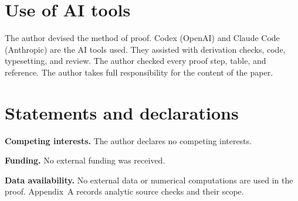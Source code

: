 \documentclass{amsart}
\numberwithin{equation}{section}
\theoremstyle{definition}
\theoremstyle{plain}
\begin{document}




\appendix



\section*{Use of AI tools}
The author devised the method of proof.
Codex (OpenAI) and Claude Code (Anthropic) are the AI tools used.
They assisted with derivation checks, code, typesetting, and review.
The author checked every proof step, table, and reference.
The author takes full responsibility for the content of the paper.

\section*{Statements and declarations}
\textbf{Competing interests.} The author declares no competing interests.

\textbf{Funding.} No external funding was received.

\textbf{Data availability.} No external data or numerical computations are used in the proof. Appendix~A records analytic source checks and their scope.
\end{document}
